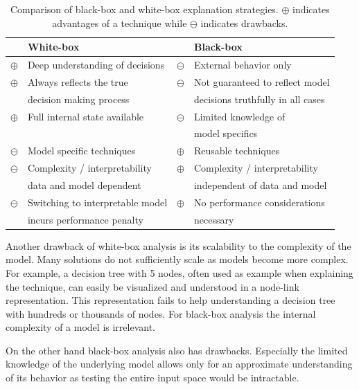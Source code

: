 \newcommand\Tstrut{\rule{0pt}{2.5ex}}
\begin{table}
     \begin{tabular}{cl|cl} 
     & \textbf{White-box} & & \textbf{Black-box} \\
     \hline
     \hline
    $\oplus$ & Deep understanding of decisions & $\ominus$ & External behavior only \Tstrut \\
    $\oplus$ & Always reflects the true & $\ominus$ & Not guaranteed to reflect model \Tstrut \\
    & decision making process & & decisions truthfully in all cases \\
    $\oplus$ & Full internal state available & $\ominus$ & Limited knowledge of \Tstrut \\
    & & & model specifics \\
    \hline
    $\ominus$ & Model specific techniques & $\oplus$ & Reusable techniques \Tstrut \\
    $\ominus$ & Complexity / interpretability & $\oplus$ & Complexity / interpretability \Tstrut \\ 
    & data and model dependent & & independent of data and model \\
    $\ominus$ & Switching to interpretable model & $\oplus$ & No performance considerations \Tstrut \\
    & incurs performance penalty & & necessary \\
    \end{tabular}
    \centering
    \vspace*{-0.5em}
    \caption[Comparison of black-box and white-box explanation strategies.]{Comparison of black-box and white-box explanation strategies. $\oplus$ indicates advantages of a technique while $\ominus$ indicates drawbacks.}
    \vspace*{-0.75em}
    \label{tab:blackvswhite}
\end{table}

Another drawback of white-box analysis is its scalability to the complexity of the model. Many solutions do not sufficiently scale as models become more complex. For example, a decision tree with 5 nodes, often used as example when explaining the technique, can easily be visualized and understood in a node-link representation. This representation fails to help understanding a decision tree with hundreds or thousands of nodes. For black-box analysis the internal complexity of a model is irrelevant.

On the other hand black-box analysis also has drawbacks. Especially the limited knowledge of the underlying model allows only for an approximate understanding of its behavior as testing the entire input space would be intractable.